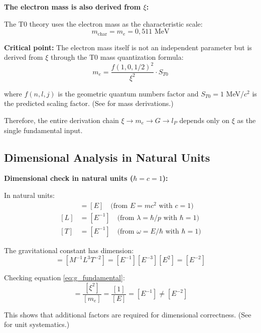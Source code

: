 	\begin{insight}
		\textbf{The electron mass is also derived from $\xi$:}
		
		The T0 theory uses the electron mass as the characteristic scale:
		\begin{equation}
			m_{\text{char}} = m_e = 0{,}511 \text{ MeV}
			\label{eq:characteristic_mass}
		\end{equation}
		
		\textbf{Critical point:} The electron mass itself is not an independent parameter but is derived from $\xi$ through the T0 mass quantization formula:
		\begin{equation}
			m_e = \frac{f(1,0,1/2)^2}{\xi^2} \cdot S_{T0}
		\end{equation}
		
		where $f(n,l,j)$ is the geometric quantum numbers factor and $S_{T0} = 1$ MeV/$c^2$ is the predicted scaling factor. (See \cite{T0_particle_masses_En} for mass derivations.)
		
		Therefore, the entire derivation chain $\xi \to m_e \to G \to l_P$ depends only on $\xi$ as the single fundamental input.
	\end{insight}
	
	\subsection{Dimensional Analysis in Natural Units}
	
	\begin{derivation}
		\textbf{Dimensional check in natural units ($\hbar = c = 1$):}
		
		In natural units:
		\begin{align}
			[M] &= [E] \quad \text{(from } E = mc^2 \text{ with } c = 1\text{)} \\
			[L] &= [E^{-1}] \quad \text{(from } \lambda = \hbar/p \text{ with } \hbar = 1\text{)} \\
			[T] &= [E^{-1}] \quad \text{(from } \omega = E/\hbar \text{ with } \hbar = 1\text{)}
		\end{align}
		
		The gravitational constant has dimension:
		\begin{equation}
			[G] = [M^{-1}L^3T^{-2}] = [E^{-1}][E^{-3}][E^2] = [E^{-2}]
		\end{equation}
		
		Checking equation \eqref{eq:g_fundamental}:
		\begin{equation}
			[G] = \frac{[\xi^2]}{[m_e]} = \frac{[1]}{[E]} = [E^{-1}] \neq [E^{-2}]
		\end{equation}
		
		This shows that additional factors are required for dimensional correctness. (See \cite{natural_units_systematics_En} for unit systematics.)
	\end{derivation}
	
